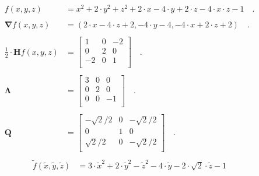 \begin{example} \label{exampHypEt3D01}
\begin{equation}
\begin{aligned}
f(x,y,z) &= x^{2} + 2\cdot y^{2} + z^{2} + 2\cdot x - 4\cdot y + 2\cdot z - 4 \cdot x \cdot z -1          \quad . \\   \\
\bm{\nabla}f(x,y,z) &= (2\cdot x - 4\cdot z +2, -4\cdot y - 4, -4\cdot x + 2\cdot z  + 2  ) \quad . \\   \\
\frac{1}{2}\cdot \mathbf{H}f(x,y,z) &= \left[
                     \begin{array}{ccc}
                       1 & 0 & -2\\
                       0 & 2 & 0\\
                       -2 & 0 & 1\\
                     \end{array}
                   \right]\quad . \\   \\
\bm{\Lambda} &= \left[
                     \begin{array}{ccc}
                       3 & 0 & 0 \\
                       0 & 2& 0 \\
                       0 & 0 & -1 \\
                     \end{array}
                   \right] \quad . \\  \\
\mathbf{Q} &= \left[
                     \begin{array}{ccc}
                       -\sqrt{2}/2 & 0 & -\sqrt{2}/2 \\
                      0& 1& 0\\
                       \sqrt{2}/2 &0 &  -\sqrt{2}/2\\
                     \end{array}
                   \right] \quad . \\
\end{aligned}
\end{equation}
\begin{equation}
\begin{aligned}
\widetilde{f}(\widetilde{x}, \widetilde{y}, \widetilde{z}) & = 3\cdot \widetilde{x}^{2} + 2\cdot \widetilde{y}^{2} - \widetilde{z}^{2} - 4\cdot \widetilde{y} -2\cdot \sqrt{2} \cdot \widetilde{z} -1 \\

\end{aligned}
\end{equation}
\end{example}
